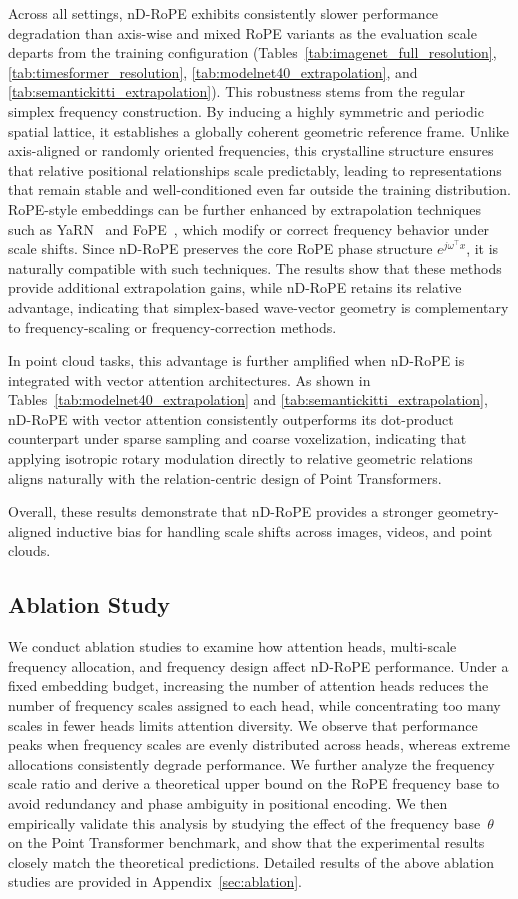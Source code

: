 \documentclass{article}
\theoremstyle{plain}
\theoremstyle{definition}
\theoremstyle{remark}
\begin{document}
Across all settings, nD-RoPE exhibits consistently slower performance degradation than axis-wise and mixed RoPE variants as the evaluation scale departs from the training configuration (Tables~\ref{tab:imagenet_full_resolution}, \ref{tab:timesformer_resolution}, \ref{tab:modelnet40_extrapolation}, and \ref{tab:semantickitti_extrapolation}).
This robustness stems from the regular simplex frequency construction. By inducing a highly symmetric and periodic spatial lattice, it establishes a globally coherent geometric reference frame. Unlike axis-aligned or randomly oriented frequencies, this crystalline structure ensures that relative positional relationships scale predictably, leading to representations that remain stable and well-conditioned even far outside the training distribution. RoPE-style embeddings can be further enhanced by extrapolation techniques such as YaRN~\cite{peng2023yarn} and FoPE~\cite{hua2025fope}, which modify or correct frequency behavior under scale shifts. Since nD-RoPE preserves the core RoPE phase structure $e^{j\omega^\top x}$, it is naturally compatible with such techniques. The results show that these methods provide additional extrapolation gains, while nD-RoPE retains its relative advantage, indicating that simplex-based wave-vector geometry is complementary to frequency-scaling or frequency-correction methods.

In point cloud tasks, this advantage is further amplified when nD-RoPE is integrated with vector attention architectures. As shown in Tables~\ref{tab:modelnet40_extrapolation} and \ref{tab:semantickitti_extrapolation}, nD-RoPE with vector attention consistently outperforms its dot-product counterpart under sparse sampling and coarse voxelization, indicating that applying isotropic rotary modulation directly to relative geometric relations aligns naturally with the relation-centric design of Point Transformers.

Overall, these results demonstrate that nD-RoPE provides a stronger geometry-aligned inductive bias for handling scale shifts across images, videos, and point clouds.

\subsection{Ablation Study}
We conduct ablation studies to examine how attention heads, multi-scale frequency allocation, and frequency design affect nD-RoPE performance. Under a fixed embedding budget, increasing the number of attention heads reduces the number of frequency scales assigned to each head, while concentrating too many scales in fewer heads limits attention diversity. We observe that performance peaks when frequency scales are evenly distributed across heads, whereas extreme allocations consistently degrade performance. We further analyze the frequency scale ratio and derive a theoretical upper bound on the RoPE frequency base to avoid redundancy and phase ambiguity in positional encoding. We then empirically validate this analysis by studying the effect of the frequency base~$\theta$ on the Point Transformer benchmark, and show that the experimental results closely match the theoretical predictions. Detailed results of the above ablation studies are provided in Appendix~\ref{sec:ablation}.
\end{document}
